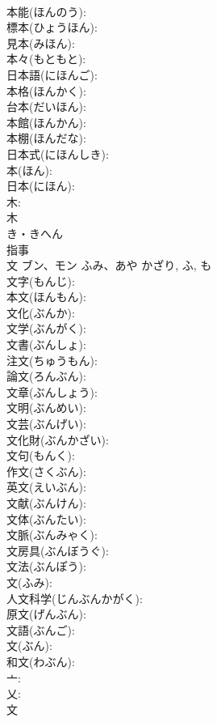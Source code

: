 \documentclass[8pt]{extreport}
\begin{document}
\begin{CJK}{UTF8}{min}
\\	本能(ほんのう): 
\\	標本(ひょうほん): 
\\	見本(みほん): 
\\	本々(もともと): 
\\	日本語(にほんご): 
\\	本格(ほんかく): 
\\	台本(だいほん): 
\\	本館(ほんかん): 
\\	本棚(ほんだな): 
\\	日本式(にほんしき): 
\\	本(ほん): 
\\	日本(にほん): 
\\	木: 
\\	木	
\\	き・きへん	
\\	指事 
\\	文	ブン、モン	ふみ、あや	かざり, ふ, も	
\\	文字(もんじ): 
\\	本文(ほんもん): 
\\	文化(ぶんか): 
\\	文学(ぶんがく): 
\\	文書(ぶんしょ): 
\\	注文(ちゅうもん): 
\\	論文(ろんぶん): 
\\	文章(ぶんしょう): 
\\	文明(ぶんめい): 
\\	文芸(ぶんげい): 
\\	文化財(ぶんかざい): 
\\	文句(もんく): 
\\	作文(さくぶん): 
\\	英文(えいぶん): 
\\	文献(ぶんけん): 
\\	文体(ぶんたい): 
\\	文脈(ぶんみゃく): 
\\	文房具(ぶんぼうぐ): 
\\	文法(ぶんぽう): 
\\	文(ふみ): 
\\	人文科学(じんぶんかがく): 
\\	原文(げんぶん): 
\\	文語(ぶんご): 
\\	文(ぶん): 
\\	和文(わぶん): 
\\	亠: 
\\	乂: 
\\	文	

\end{CJK}
\end{document}
